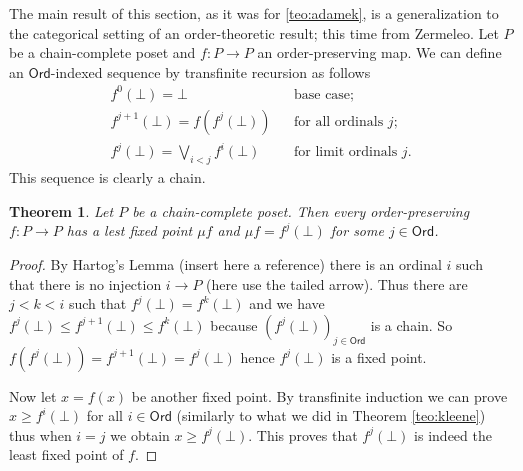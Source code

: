 \documentclass[letterpaper, 11pt, oneside]{memoir}
\theoremstyle{myteo}
\newtheorem{theorem}{Theorem}[section]
\numberwithin{equation}{section}
\newcommand{\Ord}{\textsf{Ord}}
\begin{document}
The main result of this section, as it was for \ref{teo:adamek}, is a generalization to the categorical setting of an order-theoretic result; this time from Zermeleo.
Let \(P\) be a chain-complete poset and \(f : P \to P\) an order-preserving map.
We can define an \(\Ord\)-indexed sequence by transfinite recursion as follows
\begin{align*}
  f^0(\bot) = \bot && \text{base case;}\\
  f^{j+1}(\bot) = f(f^j(\bot)) && \text{for all ordinals \(j\);} \\
  f^j(\bot) = \bigvee_{i < j}f^i(\bot) && \text{for limit ordinals \(j\).}
\end{align*}
This sequence is clearly a chain.

\begin{theorem}
  \label{teo:zermeleo}
  Let \(P\) be a chain-complete poset.
  Then every order-preserving \(f : P \to P\) has a lest fixed point \(\mu f\) and \(\mu f = f^j(\bot)\) for some \(j \in \Ord\).
\end{theorem}

\begin{proof}
  By Hartog's Lemma (insert here a reference) there is an ordinal \(i\) such that there is no injection \(i \to P\) (here use the tailed arrow).
  Thus there are \(j < k < i\) such that \(f^j(\bot) = f^k(\bot)\) and we have \(f^j(\bot) \leq f^{j+1}(\bot) \leq f^k(\bot)\) because \((f^j(\bot))_{j\in\Ord}\) is a chain.
  So \(f(f^j(\bot)) = f^{j+1}(\bot) = f^j(\bot)\) hence \(f^j(\bot)\) is a fixed point.

  Now let \(x = f(x)\) be another fixed point.
  By transfinite induction we can prove \(x \geq f^i(\bot)\) for all \(i \in \Ord\) (similarly to what we did in Theorem \ref{teo:kleene}) thus when \(i = j\) we obtain \(x \geq f^j(\bot)\).
  This proves that \(f^j(\bot)\) is indeed the least fixed point of \(f\).
\end{proof}

\printbibliography
\end{document}
